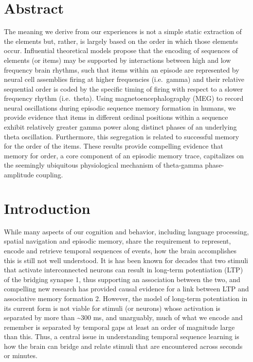 \section{Abstract}\label{abstract}

The meaning we derive from our experiences is not a simple static
extraction of the elements but, rather, is largely based on the order in
which those elements occur. Influential theoretical models propose that
the encoding of sequences of elements (or items) may be supported by
interactions between high and low frequency brain rhythms, such that
items within an episode are represented by neural cell assemblies firing
at higher frequencies (i.e.~gamma) and their relative sequential order
is coded by the specific timing of firing with respect to a slower
frequency rhythm (i.e.~theta). Using magnetoencephalography (MEG) to
record neural oscillations during episodic sequence memory formation in
humans, we provide evidence that items in different ordinal positions
within a sequence exhibit relatively greater gamma power along distinct
phases of an underlying theta oscillation. Furthermore, this segregation
is related to successful memory for the order of the items. These
results provide compelling evidence that memory for order, a core
component of an episodic memory trace, capitalizes on the seemingly
ubiquitous physiological mechanism of theta-gamma phase-amplitude
coupling.

\section{Introduction}\label{introduction}

While many aspects of our cognition and behavior, including language
processing, spatial navigation and episodic memory, share the
requirement to represent, encode and retrieve temporal sequences of
events, how the brain accomplishes this is still not well understood. It
is has been known for decades that two stimuli that activate
interconnected neurons can result in long-term potentiation (LTP) of the
bridging synapse 1, thus supporting an association between the two, and
compelling new research has provided causal evidence for a link between
LTP and associative memory formation 2. However, the model of long-term
potentiation in its current form is not viable for stimuli (or neurons)
whose activation is separated by more than \textasciitilde{}300 ms, and
unarguably, much of what we encode and remember is separated by temporal
gaps at least an order of magnitude large than this. Thus, a central
issue in understanding temporal sequence learning is how the brain can
bridge and relate stimuli that are encountered across seconds or
minutes.

